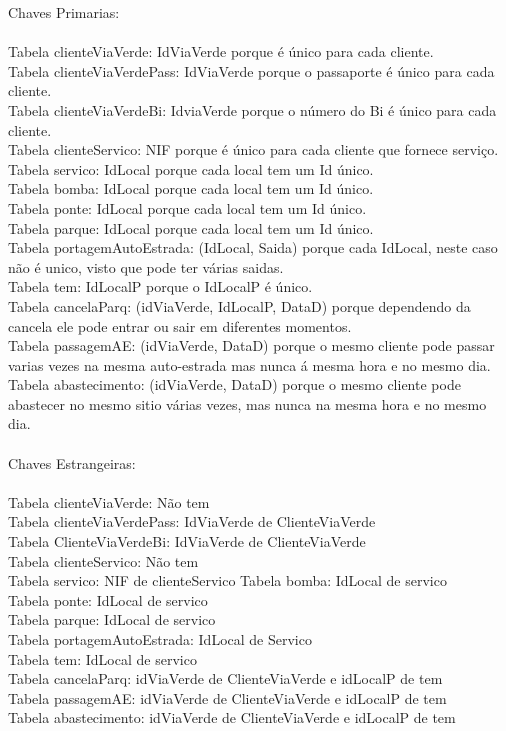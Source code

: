 \documentclass[a4paper]{article}
\begin{document}
Chaves Primarias:\\
\\
Tabela clienteViaVerde: IdViaVerde porque é único para cada cliente.\\
Tabela clienteViaVerdePass: IdViaVerde porque o passaporte é único para cada cliente.\\
Tabela clienteViaVerdeBi: IdviaVerde porque o número do Bi é único para cada cliente.\\
Tabela clienteServico: NIF porque é único para cada cliente que fornece serviço.\\
Tabela servico: IdLocal porque cada local tem um Id único.\\
Tabela bomba: IdLocal porque cada local tem um Id único.\\
Tabela ponte: IdLocal porque cada local tem um Id único.\\
Tabela parque: IdLocal porque cada local tem um Id único.\\
Tabela portagemAutoEstrada: (IdLocal, Saida) porque cada IdLocal, neste caso não é unico, visto que pode ter várias saidas.\\
Tabela tem: IdLocalP porque o IdLocalP é único.\\
Tabela cancelaParq: (idViaVerde, IdLocalP, DataD) porque dependendo da cancela ele pode entrar ou sair em diferentes momentos.\\
Tabela passagemAE: (idViaVerde, DataD) porque o mesmo cliente pode passar varias vezes na mesma auto-estrada mas nunca á mesma hora e no mesmo dia.\\
Tabela abastecimento: (idViaVerde, DataD) porque o mesmo cliente pode abastecer no mesmo sitio várias vezes, mas nunca na mesma hora e no mesmo dia.\\
\\
Chaves Estrangeiras:\\
\\
Tabela clienteViaVerde: Não tem\\
Tabela clienteViaVerdePass: IdViaVerde de ClienteViaVerde\\
Tabela ClienteViaVerdeBi: IdViaVerde de ClienteViaVerde\\
Tabela clienteServico: Não tem\\
Tabela servico: NIF de clienteServico
Tabela bomba: IdLocal de servico\\
Tabela ponte: IdLocal de servico\\
Tabela parque: IdLocal de servico\\
Tabela portagemAutoEstrada: IdLocal de Servico\\
Tabela tem: IdLocal de servico\\
Tabela cancelaParq: idViaVerde de ClienteViaVerde e idLocalP de tem\\
Tabela passagemAE: idViaVerde de ClienteViaVerde e idLocalP de tem\\
Tabela abastecimento: idViaVerde de ClienteViaVerde e idLocalP de tem\\
\end{document}
